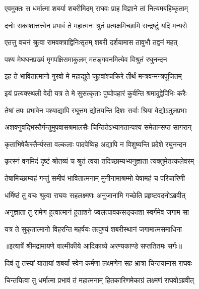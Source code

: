\twolineshloka
{एवमुक्तः स धर्मात्मा शबर्या शबरीमिदम्}
{राघवः प्राह विज्ञाने तां नित्यमबहिष्कृताम्} %

\twolineshloka
{दनोः सकाशात्तत्त्वेन प्रभावं ते महात्मनः}
{श्रुतं प्रत्यक्षमिच्छामि सन्द्रष्टुं यदि मन्यसे} %

\twolineshloka
{एतत्तु वचनं श्रुत्वा रामवक्त्राद्विनिःसृतम्}
{शबरी दर्शयामास तावुभौ तद्वनं महत्} %

\twolineshloka
{पश्य मेघघनप्रख्यं मृगपक्षिसमाकुलम्}
{मतङ्गवनमित्येव विश्रुतं रघुनन्दन} %

\twolineshloka
{इह ते भावितात्मानो गुरवो मे महाद्युते}
{जुहवांश्चक्रिरे तीर्थं मन्त्रवन्मन्त्रपूजितम्} %

\twolineshloka
{इयं प्रत्यक्स्थली वेदी यत्र ते मे सुसत्कृताः}
{पुष्पोपहारं कुर्वन्ति श्रमादुद्वेपिभिः करैः} %

\twolineshloka
{तेषां तपः प्रभावेन पश्याद्यापि रघूत्तम}
{द्योतयन्ति दिशः सर्वाः श्रिया वेद्योऽतुलप्रभाः} %

\twolineshloka
{अशक्नुवद्भिस्तैर्गन्तुमुपवासश्रमालसैः}
{चिन्तितेऽभ्यागतान्पश्य समेतान्सप्त सागरान्} %

\twolineshloka
{कृताभिषेकैस्तैर्न्यस्ता वल्कलाः पादपेष्विह}
{अद्यापि न विशुष्यन्ति प्रदेशे रघुनन्दन} %

\twolineshloka
{कृत्स्नं वनमिदं दृष्टं श्रोतव्यं च श्रुतं त्वया}
{तदिच्छाम्यभ्यनुज्ञाता त्यक्तुमेतत्कलेवरम्} %

\twolineshloka
{तेषामिच्छाम्यहं गन्तुं समीपं भावितात्मनाम्}
{मुनीनामाश्रम्मो येषामहं च परिचारिणी} %

\twolineshloka
{धर्मिष्ठं तु वचः श्रुत्वा राघवः सहलक्ष्मणः}
{अनुजानामि गच्छेति प्रहृष्टवदनोऽब्रवीत्} %

\twolineshloka
{अनुज्ञाता तु रामेण हुत्वात्मानं हुताशने}
{ज्वलत्पावकसङ्काशा स्वर्गमेव जगाम सा} %

\twolineshloka
{यत्र ते सुकृतात्मानो विहरन्ति महर्षयः}
{तत्पुण्यं शबरीस्थानं जगामात्मसमाधिना} %


{॥इत्यार्षे श्रीमद्रामायणे वाल्मीकीये आदिकाव्ये अरण्यकाण्डे सप्ततितमः सर्गः॥}


\twolineshloka
{दिवं तु तस्यां यातायां शबर्यां स्वेन कर्मणा}
{लक्ष्मणेन सह भ्रात्रा चिन्तयामास राघवः} %

\twolineshloka
{चिन्तयित्वा तु धर्मात्मा प्रभावं तं महात्मनाम्}
{हितकारिणमेकाग्रं लक्ष्मणं राघवोऽब्रवीत्} %

